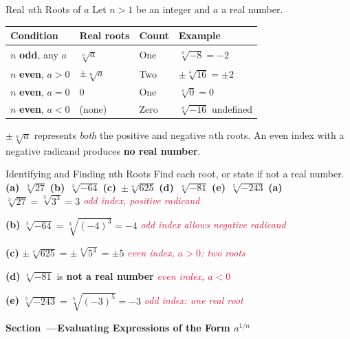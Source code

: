 \documentclass[12pt]{article}
\newcounter{mysec}
\newcommand{\mysection}[1]{%
  \stepcounter{mysec}%
  \vspace{14pt}%
  \noindent
  \begin{tcolorbox}[enhanced,colback=navy,colframe=navy,
    boxrule=0pt,arc=3pt,left=8pt,right=8pt,top=5pt,bottom=5pt,
    before skip=0pt,after skip=10pt]
    \color{white}\bfseries\large Section~\themysec\enspace---\enspace #1
  \end{tcolorbox}}
\newcommand{\step}[1]{\hfill\textcolor{crimson}{\small\textit{#1}}}
\begin{document}
\begin{conceptbox}{Real \textit{n}th Roots of $a$}
Let $n>1$ be an integer and $a$ a real number.
\begin{center}
\renewcommand{\arraystretch}{1.5}
\begin{tabular}{@{}llll@{}}
\toprule
\textbf{Condition} & \textbf{Real roots} & \textbf{Count} & \textbf{Example} \\
\midrule
$n$ \textbf{odd}, any $a$       & $\sqrt[n]{a}$       & One   & $\sqrt[3]{-8}=-2$ \\
$n$ \textbf{even}, $a>0$        & $\pm\sqrt[n]{a}$    & Two   & $\pm\sqrt[4]{16}=\pm2$ \\
$n$ \textbf{even}, $a=0$        & $0$                 & One   & $\sqrt[4]{0}=0$ \\
$n$ \textbf{even}, $a<0$        & (none)              & Zero  & $\sqrt[4]{-16}$ undefined \\
\bottomrule
\end{tabular}
\end{center}
\begin{notebox}
$\pm\sqrt[n]{a}$ represents \emph{both} the positive and negative $n$th roots.
An even index with a negative radicand produces \textbf{no real number}.
\end{notebox}
\end{conceptbox}

\begin{examplebox}{Identifying and Finding nth Roots}
Find each root, or state if not a real number.\\[4pt]
\textbf{(a)}~$\sqrt[3]{27}$\quad
\textbf{(b)}~$\sqrt[3]{-64}$\quad
\textbf{(c)}~$\pm\sqrt[4]{625}$\quad
\textbf{(d)}~$\sqrt[4]{-81}$\quad
\textbf{(e)}~$\sqrt[5]{-243}$
\tcblower
\textbf{(a)} $\sqrt[3]{27}=\sqrt[3]{3^3}=3$ \step{odd index, positive radicand}

\medskip
\textbf{(b)} $\sqrt[3]{-64}=\sqrt[3]{(-4)^3}=-4$ \step{odd index allows negative radicand}

\medskip
\textbf{(c)} $\pm\sqrt[4]{625}=\pm\sqrt[4]{5^4}=\pm5$ \step{even index, $a>0$: two roots}

\medskip
\textbf{(d)} $\sqrt[4]{-81}$ is \textbf{not a real number} \step{even index, $a<0$}

\medskip
\textbf{(e)} $\sqrt[5]{-243}=\sqrt[5]{(-3)^5}=-3$ \step{odd index: one real root}
\end{examplebox}

\mysection{Evaluating Expressions of the Form $a^{1/n}$}
\end{document}
